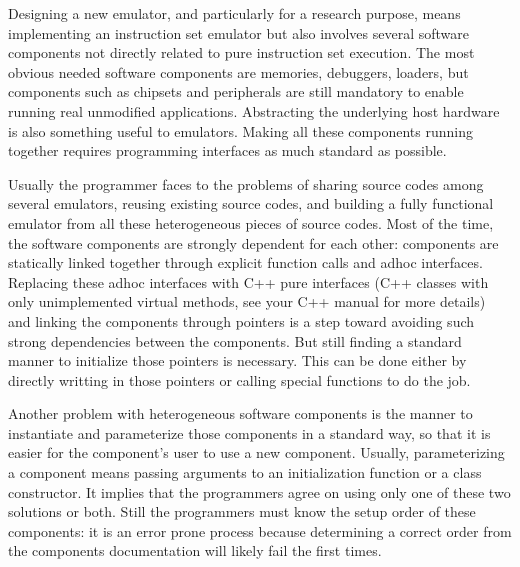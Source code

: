 Designing a new emulator, and particularly for a research purpose, means implementing an instruction set emulator but also involves several software components not directly related to pure instruction set execution.
The most obvious needed software components are memories, debuggers, loaders, but components such as chipsets and peripherals are still mandatory to enable running real unmodified applications.
Abstracting the underlying host hardware is also something useful to emulators.
Making all these components running together requires programming interfaces as much standard as possible.

Usually the programmer faces to the problems of sharing source codes among several emulators, reusing existing source codes, and building a fully functional emulator from all these heterogeneous pieces of source codes.
Most of the time, the software components are strongly dependent for each other: components are statically linked together through explicit function calls and adhoc interfaces.
Replacing these adhoc interfaces with C++ pure interfaces (C++ classes with only unimplemented virtual methods, see your C++ manual for more details) and linking the components through pointers is a step toward avoiding such strong dependencies between the components. But still finding a standard manner to initialize those pointers is necessary. This can be done either by directly writting in those pointers or calling special functions to do the job.

Another problem with heterogeneous software components is the manner to instantiate and parameterize those components in a standard way, so that it is easier for the component's user to use a new component.
Usually, parameterizing a component means passing arguments to an initialization function or a class constructor. It implies that the programmers agree on using only one of these two solutions or both.
Still the programmers must know the setup order of these components: it is an error prone process because determining a correct order from the components documentation will likely fail the first times.


